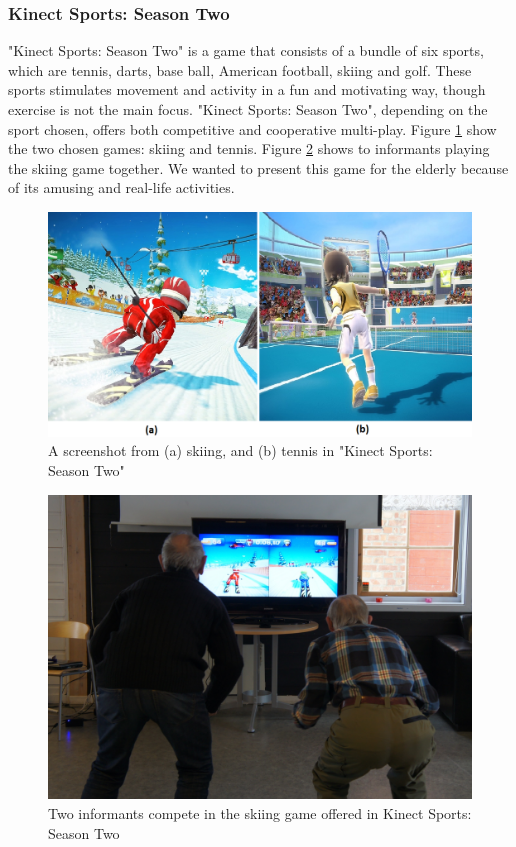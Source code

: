 \subsubsection{Kinect Sports: Season Two}
"Kinect Sports: Season Two" is a game that consists of a bundle of six sports, which are tennis, darts, base ball, American football, skiing and golf. These sports stimulates movement and activity in a fun and motivating way, though exercise is not the main focus. "Kinect Sports: Season Two", depending on the sport chosen, offers both competitive and cooperative multi-play. Figure \ref{fig:sportsgame} show the two chosen games: skiing and tennis. Figure \ref{fig:elderlyskii} shows to informants playing the skiing game together. We wanted to present this game for the elderly because of its amusing and real-life activities. 

\begin{figure} [H]
\centering
\includegraphics[scale=0.45]{skiitennis}
\caption[Kinect Sports Season Two, Skiing and Tennis]{A screenshot from (a) skiing, and (b) tennis in "Kinect Sports: Season Two" \cite{sportsgame}}
\label{fig:sportsgame}
\end{figure}

\begin{figure}
\centering
\includegraphics[scale=0.5]{eldreSpiller.jpg}
\caption[Kinect Sports Season Two, Multi-play]{Two informants compete in the skiing game offered in Kinect Sports: Season Two}
\label{fig:elderlyskii}
\end{figure}


